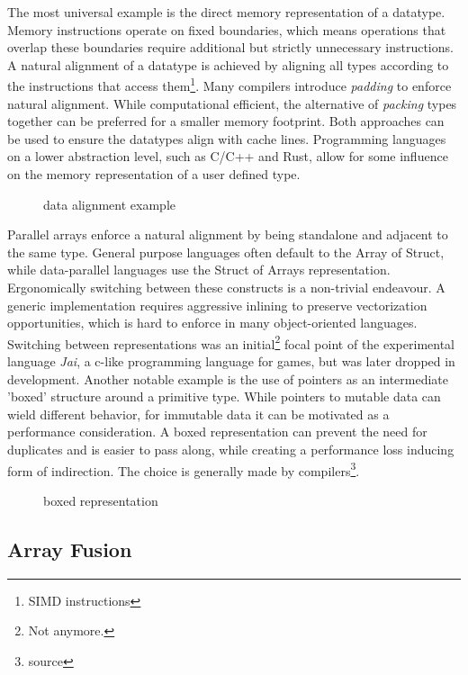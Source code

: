 \documentclass{article}
\begin{document}
The most universal example is the direct memory representation of a datatype. 
Memory instructions operate on fixed boundaries, which means operations that overlap these boundaries require additional but strictly unnecessary instructions.
A natural alignment of a datatype is achieved by aligning all types according to the instructions that access them\footnote{SIMD instructions}. 
Many compilers introduce {\it padding} to enforce natural alignment.
While computational efficient, the alternative of {\it packing} types together can be preferred for a smaller memory footprint.  
Both approaches can be used to ensure the datatypes align with cache lines. 
Programming languages on a lower abstraction level, such as C/C++ and Rust, allow for some influence on the memory representation of a user defined type.  

\begin{figure}[ht]
    \centering
    \caption{data alignment example}
\end{figure}

Parallel arrays enforce a natural alignment by being standalone and adjacent to the same type.
General purpose languages often default to the Array of Struct, while data-parallel languages use the Struct of Arrays representation.
Ergonomically switching between these constructs is a non-trivial endeavour. 
A generic implementation requires aggressive inlining to preserve vectorization opportunities, which is hard to enforce in many object-oriented languages.   
Switching between representations was an initial\footnote{Not anymore.} focal point of the experimental language {\it Jai}, a c-like programming language for games, but was later dropped in development.
Another notable example is the use of pointers as an intermediate 'boxed' structure around a primitive type. 
While pointers to mutable data can wield different behavior, for immutable data it can be motivated as a performance consideration.
A boxed representation can prevent the need for duplicates and is easier to pass along, while creating a performance loss inducing form of indirection.
The choice is generally made by compilers\footnote{source}.

\begin{figure}[ht]
    \centering
    \caption{boxed representation}
\end{figure}

\subsection{Array Fusion}
\end{document}
